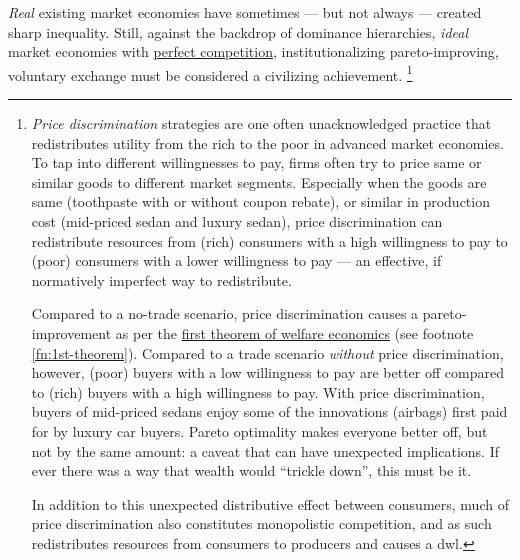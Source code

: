 \emph{Real} existing market economies have sometimes --- but not always --- created sharp inequality.
Still, against the backdrop of dominance hierarchies, \emph{ideal} market economies with \hyperref[fn:perfect-competition]{perfect competition}, institutionalizing pareto-improving, voluntary exchange must be considered a civilizing achievement.
\footnote{
	\emph{Price discrimination} strategies are one often unacknowledged practice that redistributes utility from the rich to the poor in advanced market economies.
	To tap into different willingnesses to pay, firms often try to price same or similar goods to different market segments.
	Especially when the goods are same (toothpaste with or without coupon rebate), or similar in production cost (mid-priced sedan and luxury sedan), price discrimination can redistribute resources from (rich) consumers with a high willingness to pay to (poor) consumers with a lower willingness to pay --- an effective, if normatively imperfect way to redistribute.

	Compared to a no-trade scenario, price discrimination causes a pareto-improvement as per the \hyperref[fn:1st-theorem]{first theorem of welfare economics} (see footnote \ref{fn:1st-theorem}).
	Compared to a trade scenario \emph{without} price discrimination, however, (poor) buyers with a low willingness to pay are better off compared to (rich) buyers with a high willingness to pay.
	With price discrimination, buyers of mid-priced sedans enjoy some of the innovations (airbags) first paid for by luxury car buyers.
	Pareto optimality makes everyone better off, but not by the same amount:
	a caveat that can have unexpected implications.
	If ever there was a way that wealth would ``trickle down'', this must be it.

	In addition to this unexpected distributive effect between consumers, much of price discrimination also constitutes monopolistic competition, and as such redistributes resources from consumers to producers and causes a \gls{dwl}.
}

